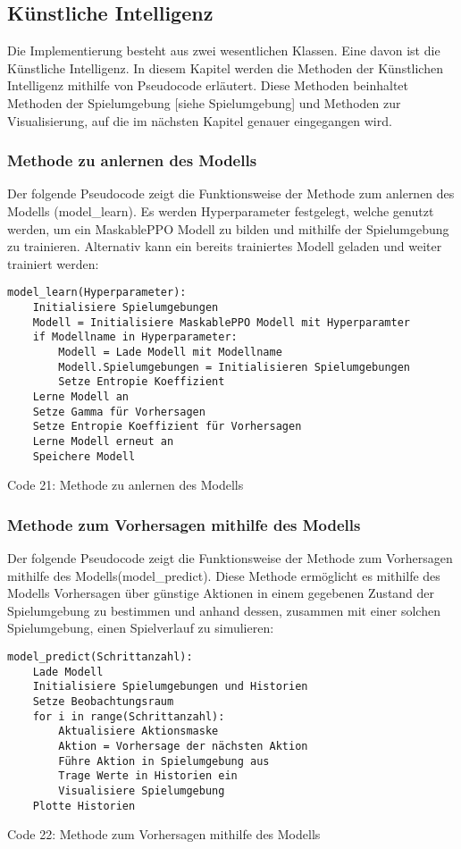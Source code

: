 \subsection{Künstliche Intelligenz}
Die Implementierung besteht aus zwei wesentlichen Klassen. Eine davon ist die Künstliche Intelligenz. In diesem Kapitel werden die Methoden der Künstlichen Intelligenz mithilfe von Pseudocode erläutert. Diese Methoden beinhaltet Methoden der Spielumgebung [siehe Spielumgebung] und Methoden zur Visualisierung, auf die im nächsten Kapitel genauer eingegangen wird.
\subsubsection{Methode zu anlernen des Modells}
\begin{minipage}{\linewidth}
Der folgende Pseudocode zeigt die Funktionsweise der Methode zum anlernen des Modells (model\_learn). Es werden Hyperparameter festgelegt, welche genutzt werden, um ein MaskablePPO Modell zu bilden und mithilfe der Spielumgebung zu trainieren. Alternativ kann ein bereits trainiertes Modell geladen und weiter trainiert werden:
\vspace{0.5cm}
\begin{lstlisting}
model_learn(Hyperparameter):
	Initialisiere Spielumgebungen
	Modell = Initialisiere MaskablePPO Modell mit Hyperparamter
	if Modellname in Hyperparameter:
		Modell = Lade Modell mit Modellname
		Modell.Spielumgebungen = Initialisieren Spielumgebungen
		Setze Entropie Koeffizient
	Lerne Modell an
	Setze Gamma für Vorhersagen
	Setze Entropie Koeffizient für Vorhersagen
	Lerne Modell erneut an
	Speichere Modell
\end{lstlisting}
Code 21: Methode zu anlernen des Modells\\
\end{minipage}
\subsubsection{Methode zum Vorhersagen mithilfe des Modells}
\begin{minipage}{\linewidth}
Der folgende Pseudocode zeigt die Funktionsweise der Methode zum Vorhersagen mithilfe des Modells(model\_predict). Diese Methode ermöglicht es mithilfe des Modells Vorhersagen über günstige Aktionen in einem gegebenen Zustand der Spielumgebung zu bestimmen und anhand dessen, zusammen mit einer solchen Spielumgebung, einen Spielverlauf zu simulieren:
\vspace{0.5cm}
\begin{lstlisting}
model_predict(Schrittanzahl):
	Lade Modell
	Initialisiere Spielumgebungen und Historien
	Setze Beobachtungsraum
	for i in range(Schrittanzahl):
		Aktualisiere Aktionsmaske
		Aktion = Vorhersage der nächsten Aktion
		Führe Aktion in Spielumgebung aus
		Trage Werte in Historien ein
		Visualisiere Spielumgebung
	Plotte Historien
\end{lstlisting}
Code 22: Methode zum Vorhersagen mithilfe des Modells\\
\end{minipage}
